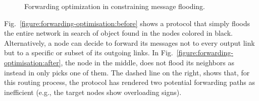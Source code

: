 \begin{figure}[ht]
\centering
{}\qquad\qquad
{}
\caption{Forwarding optimization in constraining message flooding.}
\label{figure:forwarding-optimisation}
\end{figure}
Fig.~\ref{figure:forwarding-optimisation:before} 
shows a protocol that simply floods the entire network 
in search of object found in the nodes colored in black.
Alternatively, a node can decide to forward its
messages not to every output link but to a specific 
or subset of its outgoing links.
In Fig.~\ref{figure:forwarding-optimisation:after}, 
the node in the middle, does not flood its neighbors as instead 
in only picks one of them.
The dashed line on the right, shows that, 
for this routing process, the protocol has
rendered two potential forwarding paths as inefficient (e.g., the target nodes
show overloading signs).

